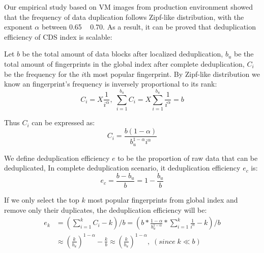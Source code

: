 Our empirical study based on VM images from production environment\cite{ieeecloud} showed that the
frequency of data duplication follows Zipf-like distribution\cite{zipf},
with the exponent $\alpha$ between 0.65 ~ 0.70.
As a result, it can be proved that deduplication efficiency of CDS index is scalable:

Let $b$ be the total amount of data blocks after localized deduplication, $b_u$ be the total amount of fingerprints 
in the global index after complete deduplication, $C_i$ be the frequency for the $i$th most popular fingerprint. 
By Zipf-like distribution we know an fingerprint's frequency is inversely proportional to its rank:
\begin{equation*}
C_i = X\frac{1}{i^\alpha},\; \sum_{i=1}^{b_u}C_i = X\sum_{i=1}^{b_u}\frac{1}{i^\alpha} = b
\end{equation*}

Thus $C_i$ can be expressed as:
\begin{equation}
C_i=\frac{b(1-\alpha)}{b_u^{1-\alpha}i^\alpha}
\end{equation}

We define deduplication efficiency $e$ to be the proportion of raw data that can be deduplicated,
In complete deduplication scenario, it deduplication efficiency $e_c$ is:
\begin{equation}
e_c = \frac{b-b_u}{b} = 1 - \frac{b_u}{b}
\end{equation}

If we only select the top $k$ most popular fingerprints from global index and remove only their duplicates,
the deduplication efficiency will be:
\begin{equation}
\begin{split}
e_k &= (\sum_{i=1}^{k}C_i - k)/{b} = (b * \frac{1-\alpha}{b_u^{1-\alpha}} * \sum_{i=1}^{k}\frac{1}{i^\alpha} - k)/b \\
&\approx (\frac{k}{b_u})^{1-\alpha} - \frac{k}{b} \approx (\frac{k}{b_u})^{1-\alpha},\; (since\; k \ll b)
\end{split}
\end{equation}


